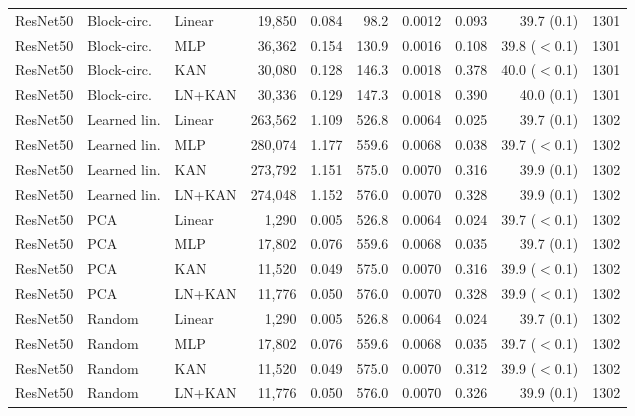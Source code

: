 \documentclass[10pt]{article}
\begin{document}
\begin{longtable}{lllrrrrrrr}
ResNet50 & Block-circ. & Linear & 19,850 & 0.084 & 98.2 & 0.0012 & 0.093 & 39.7 (0.1) & 1301 \\
ResNet50 & Block-circ. & MLP & 36,362 & 0.154 & 130.9 & 0.0016 & 0.108 & 39.8 ($<$0.1) & 1301 \\
ResNet50 & Block-circ. & KAN & 30,080 & 0.128 & 146.3 & 0.0018 & 0.378 & 40.0 ($<$0.1) & 1301 \\
ResNet50 & Block-circ. & LN+KAN & 30,336 & 0.129 & 147.3 & 0.0018 & 0.390 & 40.0 (0.1) & 1301 \\
ResNet50 & Learned lin. & Linear & 263,562 & 1.109 & 526.8 & 0.0064 & 0.025 & 39.7 (0.1) & 1302 \\
ResNet50 & Learned lin. & MLP & 280,074 & 1.177 & 559.6 & 0.0068 & 0.038 & 39.7 ($<$0.1) & 1302 \\
ResNet50 & Learned lin. & KAN & 273,792 & 1.151 & 575.0 & 0.0070 & 0.316 & 39.9 (0.1) & 1302 \\
ResNet50 & Learned lin. & LN+KAN & 274,048 & 1.152 & 576.0 & 0.0070 & 0.328 & 39.9 (0.1) & 1302 \\
ResNet50 & PCA & Linear & 1,290 & 0.005 & 526.8 & 0.0064 & 0.024 & 39.7 ($<$0.1) & 1302 \\
ResNet50 & PCA & MLP & 17,802 & 0.076 & 559.6 & 0.0068 & 0.035 & 39.7 (0.1) & 1302 \\
ResNet50 & PCA & KAN & 11,520 & 0.049 & 575.0 & 0.0070 & 0.316 & 39.9 ($<$0.1) & 1302 \\
ResNet50 & PCA & LN+KAN & 11,776 & 0.050 & 576.0 & 0.0070 & 0.328 & 39.9 ($<$0.1) & 1302 \\
ResNet50 & Random & Linear & 1,290 & 0.005 & 526.8 & 0.0064 & 0.024 & 39.7 (0.1) & 1302 \\
ResNet50 & Random & MLP & 17,802 & 0.076 & 559.6 & 0.0068 & 0.035 & 39.7 ($<$0.1) & 1302 \\
ResNet50 & Random & KAN & 11,520 & 0.049 & 575.0 & 0.0070 & 0.312 & 39.9 ($<$0.1) & 1302 \\
ResNet50 & Random & LN+KAN & 11,776 & 0.050 & 576.0 & 0.0070 & 0.326 & 39.9 (0.1) & 1302 \\
\end{longtable}
\vspace{-6pt}{\footnotesize CPU: module alone, one thread, batch 1; Model: whole model on the GPU, batch 64. Block-circ., block-circulant; Learned lin., learned linear. Shares are relative to the whole model (ViT-B/16: 85.80 M parameters, 35.13 GFLOPs; ResNet50: 23.51 M, 8.17 GFLOPs); fixed PCA and random projection matrices are not trainable and are not counted as parameters, but their operations are counted as FLOPs. Latency: median of 100 iterations after 20 warm-up iterations, fp32; whole-model interquartile range in parentheses. Hardware: NVIDIA GeForce RTX 4080, Intel Core i9, PyTorch 2.5.1, CUDA 12.1.\par}
\normalsize
\end{document}
